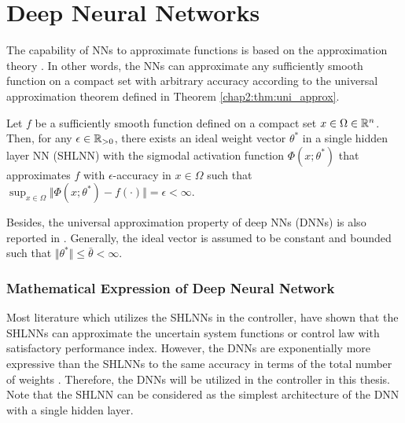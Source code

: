 \section{Deep Neural Networks}


The capability of NNs to approximate functions is based on the approximation theory \cite{RN4}. 
In other words, the NNs can approximate any sufficiently smooth function on a compact set with arbitrary accuracy according to the universal approximation theorem defined in Theorem \ref{chap2:thm:uni_approx}.

\begin{theorem}

  Let $f$ be a sufficiently smooth function defined on a compact set $x\in\Omega\in\mathbb{R}^n$.
  Then, for any $\epsilon\in\mathbb{R}_{>0}$, there exists an ideal weight vector $\theta^*$ in a single hidden layer NN (SHLNN) with the sigmodal activation function $\Phi(x;\theta^*)$ that approximates $f$ with $\epsilon$-accuracy in $x\in\Omega$ such that $\sup_{x\in\Omega}\Vert \Phi(x;\theta^*) - f(\cdot) \Vert = \epsilon < \infty$.

  \label{chap2:thm:uni_approx}
\end{theorem}

Besides, the universal approximation property of deep NNs (DNNs) is also reported in \cite{RN70}.
Generally, the ideal vector is assumed to be constant and bounded such that $\Vert\theta^*\Vert\le \bar\theta <\infty$.

\subsubsection{Mathematical Expression of Deep Neural Network} \label{chap2:sec:DNN}

Most literature which utilizes the SHLNNs in the controller, have shown that the SHLNNs can approximate the uncertain system functions or control law with satisfactory performance index.
However, the DNNs are exponentially more expressive than the SHLNNs to the same accuracy in terms of the total number of weights \cite{RN65}.
Therefore, the DNNs will be utilized in the controller in this thesis.
Note that the SHLNN can be considered as the simplest architecture of the DNN with a single hidden layer.

